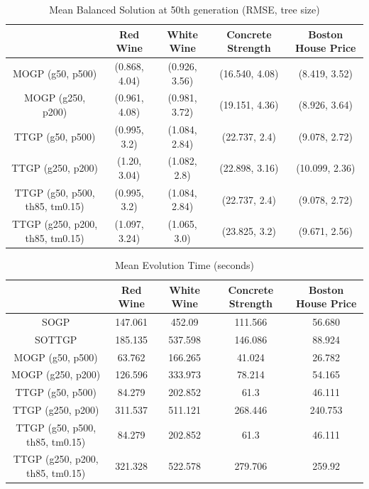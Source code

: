 \documentclass[a4paper, twocolumn]{article}
\begin{document}
\begin{table}[t]
	\begin{center}
		\caption{Mean Balanced Solution at 50th generation (RMSE, tree size)}
		\label{table:3}
		\begin{tabular}{ c|cccc }
			& Red Wine & White Wine & Concrete Strength & Boston House Price\\
			\hline
			MOGP (g50, p500) &(0.868, 4.04)&(0.926, 3.56)&(16.540, 4.08)&(8.419, 3.52)\\
			MOGP (g250, p200) &(0.961, 4.08)&(0.981, 3.72)&(19.151, 4.36)&(8.926, 3.64)\\
			TTGP (g50, p500) &(0.995, 3.2)&(1.084, 2.84)&(22.737, 2.4)&(9.078, 2.72)\\
			TTGP (g250, p200) &(1.20, 3.04)&(1.082, 2.8)&(22.898, 3.16)&(10.099, 2.36)\\
			TTGP (g50, p500, th85, tm0.15) &(0.995, 3.2)&(1.084, 2.84)&(22.737, 2.4)&(9.078, 2.72)\\
			TTGP (g250, p200, th85, tm0.15) &(1.097, 3.24)&(1.065, 3.0)&(23.825, 3.2)&(9.671, 2.56)\\
		\end{tabular}
	\end{center}
\end{table}
\begin{table}[t]
	\begin{center}
		\caption{Mean Evolution Time (seconds)}
		\label{table:4}
		\begin{tabular}{ c|cccc }
			& Red Wine & White Wine & Concrete Strength & Boston House Price\\
			\hline
			SOGP &147.061&452.09&111.566&56.680\\
			SOTTGP &185.135&537.598&146.086&88.924\\
			MOGP (g50, p500) &63.762&166.265&41.024&26.782\\
			MOGP (g250, p200) &126.596&333.973&78.214&54.165\\
			TTGP (g50, p500) &84.279&202.852&61.3&46.111\\
			TTGP (g250, p200) &311.537&511.121&268.446&240.753\\
			TTGP (g50, p500, th85, tm0.15) &84.279&202.852&61.3&46.111\\
			TTGP (g250, p200, th85, tm0.15) &321.328&522.578&279.706&259.92\\
		\end{tabular}
	\end{center}
\end{table}
\end{document}
